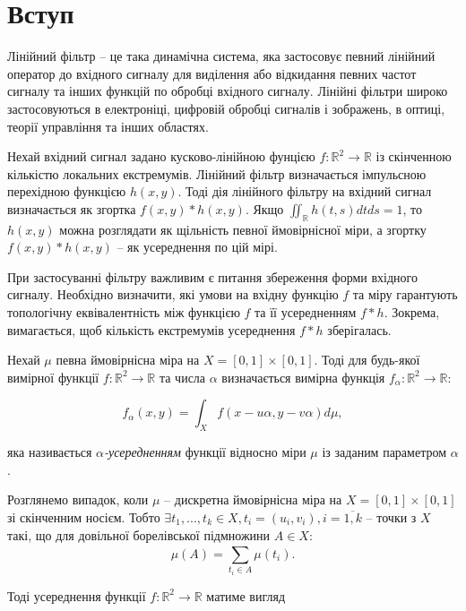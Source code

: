\documentclass[12pt]{article}
\begin{document}
\section{Вступ}
	

\hspace{0.5cm} Лінійний фільтр – це така динамічна система, яка застосовує певний лінійний оператор до вхідного сигналу для виділення або відкидання певних частот сигналу та інших функцій по обробці вхідного сигналу. Лінійні фільтри широко застосовуються в електроніці, цифровій обробці сигналів і зображень, в оптиці, теорії управління та інших областях. 

Нехай вхідний сигнал задано кусково-лінійною фунцією $f:\mathbb{R}^2\rightarrow \mathbb{R}$ із скінченною кількістю локальних екстремумів. Лінійний фільтр визначається імпульсною перехідною функцією $h(x,y)$. Тоді дія лінійного фільтру на вхідний сигнал визначається як згортка $f(x,y)\ast h(x,y)$. Якщо $\iint_{\mathbb{R}}^{}h(t,s)dt ds=1$, то $h(x,y)$ можна розглядати як щільність певної ймовірнісної міри, а згортку $f(x,y)\ast h(x,y)$ – як усереднення по цій мірі.

При застосуванні фільтру важливим є питання збереження форми вхідного сигналу. Необхідно визначити, які умови на вхідну функцію $f$ та міру гарантують топологічну еквівалентність між функцією $f$ та її усередненням $f\ast h$. Зокрема, вимагається, щоб кількість екстремумів усереднення $f\ast h$ зберігалась.

Нехай $\mu$ певна ймовірнісна міра на $X=[0,1]\times [0,1]$. Тоді для будь-якої вимірної функції $f:\mathbb{R}^2\rightarrow \mathbb{R}$ та числа $\alpha$ визначається вимірна функція $f_{\alpha}:\mathbb{R}^2\rightarrow \mathbb{R}$:

\begin{equation} 
	\label{int_averaging}
	f_\alpha(x,y)= \int_{X}^{} f(x-u\alpha, y-v\alpha)d\mu,
\end{equation}

\hspace{-0.6cm}яка називається \emph{$\alpha$-усередненням} функції відносно міри $\mu$ із заданим параметром $\alpha$. 

Розглянемо випадок, коли $\mu$ – дискретна ймовірнісна міра на $X=[0,1]\times [0,1]$ зі скінченним носієм. Тобто $\exists t_{1},...,t_{k} \in X, t_{i}=(u_{i},v_{i}), i=\overline{1,k}$ – точки з $X$ такі, що для довільної борелівської підмножини $A\in X$: 
$$\mu(A)=\sum_{t_i \in A}^{}\mu(t_i).$$

Тоді усереднення функції $f:\mathbb{R}^2\rightarrow \mathbb{R}$ матиме вигляд 
\end{document}
